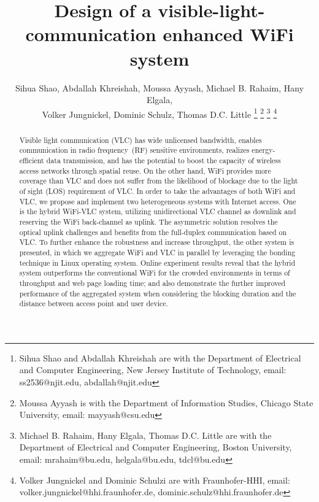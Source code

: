 \documentclass[10pt,journal]{IEEEtran}
\begin{document}
\title{Design of a visible-light-communication enhanced WiFi system}

\author{Sihua Shao, Abdallah Khreishah, Moussa Ayyash, Michael B. Rahaim, Hany Elgala, \\Volker Jungnickel, Dominic Schulz, Thomas D.C. Little
\thanks{Sihua Shao and Abdallah Khreishah are with the Department of Electrical and Computer Engineering,
New Jersey Institute of Technology, email: ss2536@njit.edu, abdallah@njit.edu}
\thanks{Moussa Ayyash is with the Department of Information Studies, Chicago State University,
email: mayyash@csu.edu}
\thanks{Michael B. Rahaim, Hany Elgala, Thomas D.C. Little are with the Department of Electrical and Computer Engineering,
Boston University, email: mrahaim@bu.edu, helgala@bu.edu, tdcl@bu.edu}
\thanks{Volker Jungnickel and Dominic Schulzi are with Fraunhofer-HHI, email: volker.jungnickel@hhi.fraunhofer.de, dominic.schulz@hhi.fraunhofer.de}}

\maketitle
\begin{abstract}
Visible light communication (VLC) has wide unlicensed bandwidth, enables communication in radio frequency~(RF) sensitive environments, realizes energy-efficient data transmission, and has the potential to boost the capacity of wireless access networks through spatial reuse. On the other hand, WiFi provides more coverage than VLC and does not suffer from the likelihood of blockage due to the light of sight (LOS) requirement of VLC. In order to take the advantages of both WiFi and VLC, we propose and implement two heterogeneous systems with Internet access. One is the hybrid WiFi-VLC system, utilizing unidirectional VLC channel as downlink and reserving the WiFi back-channel as uplink. The asymmetric solution resolves the optical uplink challenges and benefits from the full-duplex communication based on VLC. To further enhance the robustness and increase throughput, the other system is presented, in which we aggregate WiFi and VLC in parallel by leveraging the bonding technique in Linux operating system. Online experiment results reveal that the hybrid system outperforms the conventional WiFi for the crowded environments in terms of throughput and web page loading time; and also demonstrate the further improved performance of the aggregated system when considering the blocking duration and the distance between access point and user device.
\end{abstract}
\end{document}

